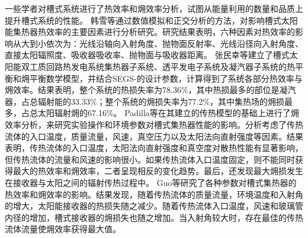 一些学者对槽式系统进行了热效率和㶲效率分析，试图从能量利用的数量和品质上提升槽式系统的性能。
韩雪等\cite{Han2016}通过数值模拟和正交分析的方法，对影响槽式太阳能集热器热效率的主要因素进行分析研究。研究结果表明，六种因素对热效率的影响从大到小依次为：光线沿轴向入射角度、抛物面反射率、光线沿径向入射角度、直接太阳辐照度、吸收器吸收率、抛物面与吸收器距离。
张民幸等\cite{Zhang2012}建立了槽式太阳能双工质回路热发电系统集热器子系统、透平发电子系统及凝汽器子系统的热平衡和㶲平衡数学模型，并结合SEGS-\uppercase\expandafter{}的设计参数，计算得到了系统各部分热效率与㶲效率。结果表明，整个系统的热损失率为78.36\%，其中热损最多的部位是凝汽器，占总辐射能的33.33\%；整个系统的㶲损失率为77.2\%，其中集热场的㶲损最多，占总太阳辐射㶲的67.16\%。
Padilla等\cite{Padilla2014}在其建立的传热模型\cite{Padilla2011}的基础上进行了㶲效率分析，来研究实验操作和环境参数对槽式集热器性能的影响。分析考虑了传热流体的入口温度，质量流量，风速，真空压力以及太阳法向直射强度等因素。结果表明，传热流体的入口温度，太阳法向直射强度和真空度对散热性能有显著影响，但传热流体的流量和风速的影响很小。如果传热流体入口温度固定，则不能同时获得最大的热效率和㶲效率，二者呈现相反的变化趋势。最后，还发现最大㶲损发生在接收器与太阳之间的辐射传热过程中。
Guo等\cite{JiangfengGuo2016-1}研究了各种参数对槽式集热器的热效率和㶲效率的影响。结果发现，随着传热流体的质量流量，环境温度和入射角的增大，太阳能接收器的热损失随之减少。随着传热流体入口温度，风速和玻璃管内径的增加，槽式接收器的㶲损失也随之增加。当入射角较大时，存在最佳的传热流体流量使㶲效率获得最大值。

